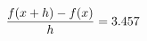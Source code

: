 \documentclass[preview]{standalone}
\begin{document}
\begin{align*}
\special{dvisvgm:raw <g id='unique000'>}\frac{f(x+h)-f(x)}{h} = 3.457\special{dvisvgm:raw </g>}
\end{align*}
\end{document}
